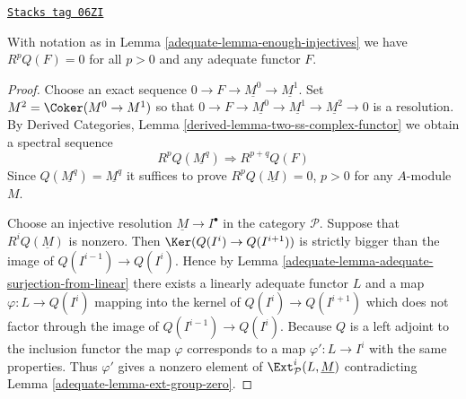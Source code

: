 \begin{lemma}[RQ zero]
\label{adequate-lemma-RQ-zero}
\href{https://stacks.math.columbia.edu/tag/06ZI}{\texttt{Stacks tag 06ZI}}

With notation as in
Lemma \ref{adequate-lemma-enough-injectives}
we have $R^pQ(F) = 0$ for all $p > 0$ and any adequate functor $F$.
\end{lemma}

\begin{proof}

Choose an exact sequence $0 \to F \to \underline{M^0} \to \underline{M^1}$.
Set $M^2 = \Coker(M^0 \to M^1)$ so that
$0 \to F \to \underline{M^0} \to \underline{M^1}
\to \underline{M^2} \to 0$ is a resolution. By
Derived Categories, Lemma \ref{derived-lemma-two-ss-complex-functor}
we obtain a spectral sequence
$$
R^pQ(\underline{M^q}) \Rightarrow R^{p + q}Q(F)
$$
Since $Q(\underline{M^q}) = \underline{M^q}$ it suffices to prove
$R^pQ(\underline{M}) = 0$, $p > 0$ for any $A$-module $M$.

\medskip\noindent
Choose an injective resolution $\underline{M} \to I^\bullet$ in
the category $\mathcal{P}$. Suppose that $R^iQ(\underline{M})$ is nonzero.
Then $\Ker(Q(I^i) \to Q(I^{i + 1}))$ is strictly bigger
than the image of $Q(I^{i - 1}) \to Q(I^i)$. Hence by
Lemma \ref{adequate-lemma-adequate-surjection-from-linear}
there exists a linearly adequate functor $L$ and a map
$\varphi : L \to Q(I^i)$ mapping into the kernel of $Q(I^i) \to Q(I^{i + 1})$
which does not factor through the image of $Q(I^{i - 1}) \to Q(I^i)$.
Because $Q$ is a left adjoint to the inclusion functor the map
$\varphi$ corresponds to a map $\varphi' : L \to I^i$ with the same properties.
Thus $\varphi'$ gives a nonzero element of
$\Ext^i_\mathcal{P}(L, \underline{M})$ contradicting
Lemma \ref{adequate-lemma-ext-group-zero}.
\end{proof}

